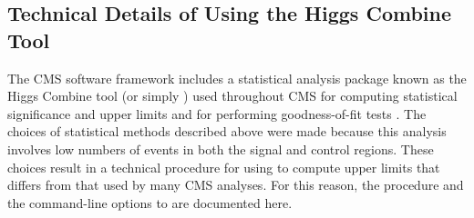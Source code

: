 \subsection{Technical Details of Using the Higgs Combine Tool}
\label{sec:dd:combine}
The CMS software framework includes a statistical analysis package known as the Higgs Combine tool (or simply \combine) used throughout CMS for computing statistical significance and upper limits and for performing goodness-of-fit tests \cite{CombineManual}.
The choices of statistical methods described above were made because this analysis involves low numbers of events in both the signal and control regions.
These choices result in a technical procedure for using \combine to compute upper limits that differs from that used by many CMS analyses.
For this reason, the procedure and the command-line options to \combine are documented here.

